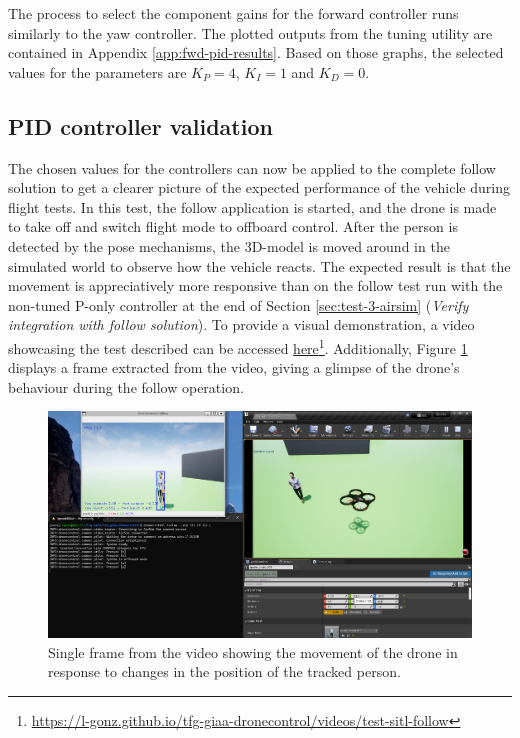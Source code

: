 The process to select the component gains for the forward controller runs similarly to the yaw controller. The plotted outputs from the tuning utility are contained in Appendix \ref{app:fwd-pid-results}. Based on those graphs, the selected values for the parameters are $K_P=4$, $K_I=1$ and $K_D=0$.


\subsection{PID controller validation}
\label{subsec:pid-test-controller}

The chosen values for the controllers can now be applied to the complete follow solution to get a clearer picture of the expected performance of the vehicle during flight tests. In this test, the follow application is started, and the drone is made to take off and switch flight mode to offboard control. After the person is detected by the pose mechanisms, the 3D-model is moved around in the simulated world to observe how the vehicle reacts. The expected result is that the movement is appreciatively more responsive than on the follow test run with the non-tuned P-only controller at the end of Section \ref{sec:test-3-airsim} (\emph{Verify integration with follow solution}). To provide a visual demonstration, a video showcasing the test described can be accessed \href{https://l-gonz.github.io/tfg-giaa-dronecontrol/videos/test-sitl-follow}{here}\footnote{\url{https://l-gonz.github.io/tfg-giaa-dronecontrol/videos/test-sitl-follow}}. Additionally, Figure \ref{fig:airsim-test-follow} displays a frame extracted from the video, giving a glimpse of the drone's behaviour during the follow operation.

\begin{figure}[H]
  \centering
  \includegraphics[width=\textwidth, keepaspectratio]{img/video-follow-sitl.png}
  \caption{Single frame from the video showing the movement of the drone in response to changes in the position of the tracked person.}\label{fig:airsim-test-follow}
\end{figure}


